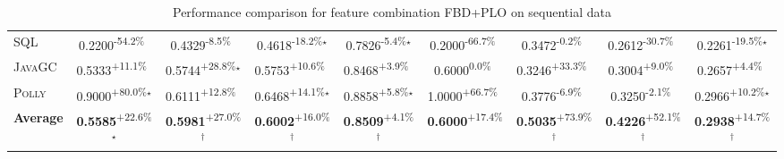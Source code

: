 \begin{table}[htbp]
\begin{tabular}{l|cccc|cccc}
\textsc{SQL} & \cellcolor{red!30}0.2200\textsuperscript{-54.2\%}$^{\,\,\,}$ & \cellcolor{red!30}0.4329\textsuperscript{-8.5\%}$^{\,\,\,}$ & \cellcolor{red!30}0.4618\textsuperscript{-18.2\%}$^\star$ & \cellcolor{red!30}0.7826\textsuperscript{-5.4\%}$^\star$ & \cellcolor{red!30}0.2000\textsuperscript{-66.7\%}$^{\,\,\,}$ & \cellcolor{red!30}0.3472\textsuperscript{-0.2\%}$^{\,\,\,}$ & \cellcolor{red!30}0.2612\textsuperscript{-30.7\%}$^{\,\,\,}$ & \cellcolor{red!30}0.2261\textsuperscript{-19.5\%}$^\star$ \\
\textsc{JavaGC} & \cellcolor{green!30}0.5333\textsuperscript{+11.1\%}$^{\,\,\,}$ & \cellcolor{green!30}0.5744\textsuperscript{+28.8\%}$^\star$ & \cellcolor{green!30}0.5753\textsuperscript{+10.6\%}$^{\,\,\,}$ & \cellcolor{green!30}0.8468\textsuperscript{+3.9\%}$^{\,\,\,}$ & \cellcolor{red!30}0.6000\textsuperscript{0.0\%}$^{\,\,\,}$ & \cellcolor{green!30}0.3246\textsuperscript{+33.3\%}$^{\,\,\,}$ & \cellcolor{green!30}0.3004\textsuperscript{+9.0\%}$^{\,\,\,}$ & \cellcolor{green!30}0.2657\textsuperscript{+4.4\%}$^{\,\,\,}$ \\
\textsc{Polly} & \cellcolor{green!30}0.9000\textsuperscript{+80.0\%}$^\star$ & \cellcolor{green!30}0.6111\textsuperscript{+12.8\%}$^{\,\,\,}$ & \cellcolor{green!30}0.6468\textsuperscript{+14.1\%}$^\star$ & \cellcolor{green!30}0.8858\textsuperscript{+5.8\%}$^\star$ & \cellcolor{green!30}1.0000\textsuperscript{+66.7\%}$^{\,\,\,}$ & \cellcolor{red!30}0.3776\textsuperscript{-6.9\%}$^{\,\,\,}$ & \cellcolor{red!30}0.3250\textsuperscript{-2.1\%}$^{\,\,\,}$ & \cellcolor{green!30}0.2966\textsuperscript{+10.2\%}$^\star$ \\
\hline
\textbf{Average} & \cellcolor{green!30}\textbf{0.5585}\textsuperscript{+22.6\%}$^\star$ & \cellcolor{green!30}\textbf{0.5981}\textsuperscript{+27.0\%}$^\dagger$ & \cellcolor{green!30}\textbf{0.6002}\textsuperscript{+16.0\%}$^\dagger$ & \cellcolor{green!30}\textbf{0.8509}\textsuperscript{+4.1\%}$^\dagger$ & \cellcolor{green!30}\textbf{0.6000}\textsuperscript{+17.4\%}$^{\,\,\,}$ & \cellcolor{green!30}\textbf{0.5035}\textsuperscript{+73.9\%}$^\dagger$ & \cellcolor{green!30}\textbf{0.4226}\textsuperscript{+52.1\%}$^\dagger$ & \cellcolor{green!30}\textbf{0.2938}\textsuperscript{+14.7\%}$^\dagger$ \\
\hline
\end{tabular}
\caption{Performance comparison for feature combination FBD+PLO on sequential data}
\label{tab:combo_FBD_PLO_performance_sequential}
\end{table}